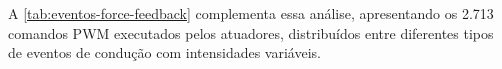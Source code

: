 %
%
%
%

A \autoref{tab:eventos-force-feedback} complementa essa análise, apresentando os 2.713 comandos PWM executados pelos atuadores, distribuídos entre diferentes tipos de eventos de condução com intensidades variáveis.

